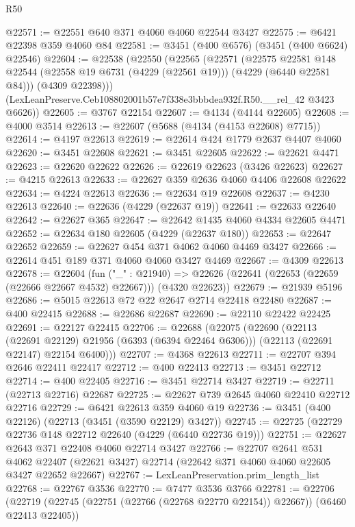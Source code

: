 \begin{lexlean}{R50}
\begin{coremodule}
@22571 := @22551 @640 @371 @4060 @4060 @22544 @3427
@22575 := @6421 @22398 @359 @4060 @84
@22581 := @3451 (@400 @6576) (@3451 (@400 @6624) @22546)
@22604 := @22538
    (@22550
      (@22565
        (@22571
          (@22575
            @22581
            @148
            @22544
            (@22558 @19 @6731 (@4229 (@22561 @19)))
            (@4229 (@6440 @22581 @84)))
          (@4309 @22398)))
      (LexLeanPreserve.Ceb108802001b57e7f338e3bbbdea932f.R50.__rel_42 @3423 @6626))
@22605 := @3767 @22154
@22607 := @4134 (@4144 @22605)
@22608 := @4000 @3514
@22613 := @22607 (@5688 (@4134 (@4153 @22608) @7715))
@22614 := @4197 @22613
@22619 := @22614 @424 @1779 @2637 @4407 @4060
@22620 := @3451 @22608
@22621 := @3451 @22605
@22622 := @22621 @4471
@22623 := @22620 @22622
@22626 := @22619 @22623 (@3426 @22623)
@22627 := @4215 @22613
@22633 := @22627 @359 @2636 @4060 @4406 @22608 @22622
@22634 := @4224 @22613
@22636 := @22634 @19 @22608
@22637 := @4230 @22613
@22640 := @22636 (@4229 (@22637 @19))
@22641 := @22633 @22640
@22642 := @22627 @365
@22647 := @22642 @1435 @4060 @4334 @22605 @4471
@22652 := @22634 @180 @22605 (@4229 (@22637 @180))
@22653 := @22647 @22652
@22659 := @22627 @454 @371 @4062 @4060 @4469 @3427
@22666 := @22614 @451 @189 @371 @4060 @4060 @3427 @4469
@22667 := @4309 @22613
@22678 := @22604
    (fun ("_" : @21940) =>
    @22626 (@22641 (@22653 (@22659 (@22666 @22667 @4532) @22667))) (@4320 @22623))
@22679 := @21939 @5196
@22686 := @5015 @22613 @72 @22 @2647 @2714 @22418 @22480
@22687 := @400 @22415
@22688 := @22686 @22687
@22690 := @22110 @22422 @22425
@22691 := @22127 @22415
@22706 := @22688
    (@22075
      (@22690
        (@22113 (@22691 @22129) @21956 (@6393 (@6394 @22464 @6306)))
        (@22113 (@22691 @22147) @22154 @6400)))
@22707 := @4368 @22613
@22711 := @22707 @394 @2646 @22411 @22417
@22712 := @400 @22413
@22713 := @3451 @22712
@22714 := @400 @22405
@22716 := @3451 @22714 @3427
@22719 := @22711 (@22713 @22716) @22687
@22725 := @22627 @739 @2645 @4060 @22410 @22712 @22716
@22729 := @6421 @22613 @359 @4060 @19
@22736 := @3451 (@400 @22126) (@22713 (@3451 (@3590 @22129) @3427))
@22745 := @22725 (@22729 @22736 @148 @22712 @22640 (@4229 (@6440 @22736 @19)))
@22751 := @22627 @2643 @371 @22408 @4060 @22714 @3427
@22766 := @22707
    @2641
    @531
    @4062
    @22407
    (@22621 @3427)
    @22714
    (@22642 @371 @4060 @4060 @22605 @3427 @22652 @22667)
@22767 := LexLeanPreservation.prim_length_list
@22768 := @22767 @3536
@22770 := @7477 @3536 @3766
@22781 := @22706
    (@22719 (@22745 (@22751 (@22766 (@22768 @22770 @22154)) @22667)) (@6460 @22413 @22405))

\end{coremodule}
\end{lexlean}
